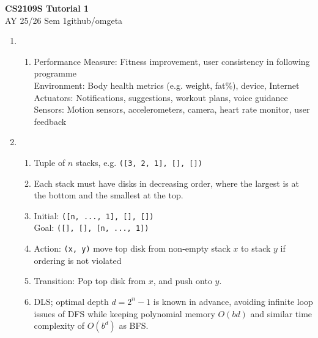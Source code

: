 \documentclass[12pt, a4paper]{article}
\newcommand{\mytitle}{CS2109S Tutorial 1}
\newcommand{\myauthor}{github/omgeta}
\newcommand{\mydate}{AY 25/26 Sem 1}
\begin{document}
\raggedright
\footnotesize
\begin{center}
{\normalsize{\textbf{\mytitle}}} \\
{\footnotesize{\mydate\hspace{2pt}\textemdash\hspace{2pt}\myauthor}}
\end{center}
\begin{enumerate}[\Alph*.]
  \item 
    \begin{enumerate}[\arabic*.]
      \item Performance Measure: Fitness improvement, user consistency in following programme\\
        Environment: Body health metrics (e.g. weight, fat\%), device, Internet\\
        Actuators: Notifications, suggestions, workout plans, voice guidance\\
        Sensors: Motion sensors, accelerometers, camera, heart rate monitor, user feedback
    \end{enumerate}

  \item 
    \begin{enumerate}[\arabic*.]
      \item Tuple of $n$ stacks, e.g. \lstinline|([3, 2, 1], [], [])|

      \item Each stack must have disks in decreasing order, where the largest is at the bottom and the smallest at the top. 

      \item Initial: \lstinline|([n, ..., 1], [], [])|\\
        Goal: \lstinline|([], [], [n, ..., 1])|

      \item Action: \lstinline|(x, y)| move top disk from non-empty stack $x$ to stack $y$ if ordering is not violated

      \item Transition: Pop top disk from $x$, and push onto $y$. 

      \item DLS; optimal depth $d= 2^n-1$ is known in advance, avoiding infinite loop issues of DFS while keeping polynomial memory $O(bd)$ and similar time complexity of $O(b^d)$ as BFS. 


\end{enumerate}
\end{enumerate}
\end{document}
